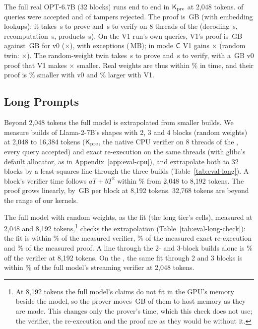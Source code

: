 The full real OPT-6.7B (32 blocks) runs end to end in $\mathsf{K}_{\mathrm{pre}}$ at 2{,}048 tokens.
\RealOptLAccepted{} of \RealOptLQueries{} queries were accepted and \RealOptLTampersRejected{} of
\RealOptLTampers{} tampers rejected. The proof is \RealOptLProof{}\,GB (with embedding lookups); it
takes \RealOptLProve{}\,s to prove and \RealOptLVerify{}\,s to verify on 8 threads of the
\PlatformCpu{} (decoding \RealOptLDecode{}\,s, recomputation \RealOptLRecompute{}\,s, products
\RealOptLProducts{}\,s). On the V1 run's own queries, V1's proof is \VOneRealOptLVOneGB{}\,GB against
\VOneRealOptLVZeroGB{}\,GB for v0 (\VOneRatioRealOptLExact{}$\times$), with \VOneRealOptLExceptions{} exceptions
(\VOneRealOptLExceptionsMB{}\,MB); in mode $\mathsf{C}$ V1 gains \VOneRatioRealOptLCExact{}$\times$ (random
twin: \RndOptLVOneRatioC{}$\times$). The random-weight twin takes \RndOptLProve{}\,s to prove and
\RndOptLVerify{}\,s to verify, with a \RndOptLProof{}\,GB v0 proof that V1 makes
\RndOptLVOneRatio{}$\times$ smaller. Real weights are thus within \RealOptLTimeWithin{}\% in time, and
their proof is \RealOptLVZeroSmaller{}\% smaller with v0 and \RealOptLVOneLarger{}\% larger with V1.

\subsection{Long Prompts}
\label{app:eval-long}

Beyond 2{,}048 tokens the full model is extrapolated from smaller builds. We measure builds of
Llama-2-7B's shapes with 2, 3 and 4 blocks (random weights) at 2{,}048 to 16{,}384 tokens ($\mathsf{K}_{\mathrm{pre}}$, the
native CPU verifier on 8 threads of the \PlatformCpu{}, every query accepted) and exact
re-execution on the same threads (with glibc's default allocator, as in
Appendix~\ref{app:eval-cpu}), and extrapolate both to 32 blocks by a least-squares line through
the three builds (Table~\ref{tab:eval-long}). A block's verifier time follows $aT+bT^2$ within
\LongFitResidual{}\% from 2{,}048 to 8{,}192 tokens. The proof grows linearly, by
\LongBytesPerBlock{}\,GB per block at 8{,}192 tokens. 32{,}768 tokens are beyond the range of our
kernels.

The full model with random weights, as the fit (the long tier's cells), measured at 2{,}048 and 8{,}192
tokens,\footnote{At 8{,}192 tokens the full model's claims do not fit in the GPU's memory beside the model, so the prover
moves \LongCheckStaged{}\,GB of them to host memory as they are made. This changes only the prover's time, which this
check does not use; the verifier, the re-execution and the proof are as they would be without it.} checks
the extrapolation (Table~\ref{tab:eval-long-check}): the fit is within \LongCheckVerify{}\% of the measured verifier,
\LongCheckReexec{}\% of the measured exact re-execution and \LongCheckProof{}\% of the measured proof. A line through the 2- and
3-block builds alone is \LongCheckTwoThree{}\% off the verifier at 8{,}192 tokens. On the \PlatformGpu{}, the same fit through 2 and
3 blocks is within \LongCheckGpu{}\% of the full model's streaming verifier at 2{,}048 tokens.

